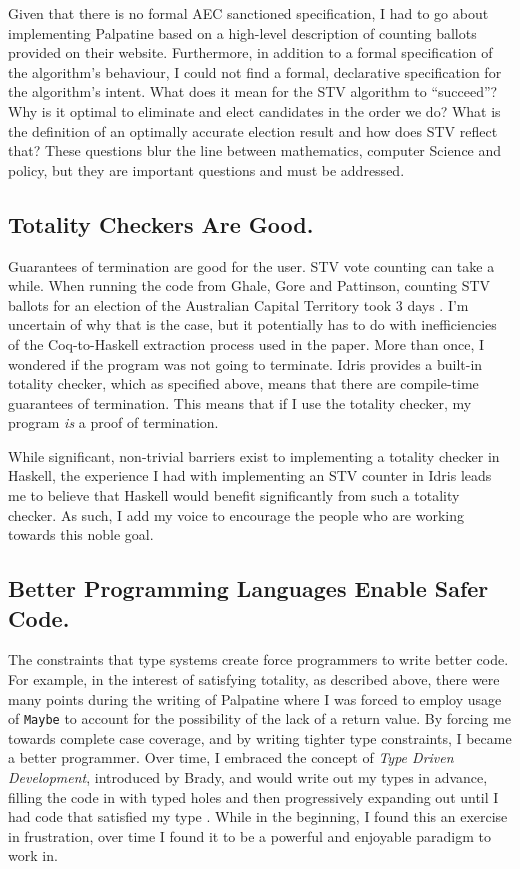 Given that there is no formal AEC sanctioned specification, I had to go about
implementing Palpatine based on a high-level description of counting ballots
provided on their website. Furthermore, in addition to a formal specification of
the algorithm's behaviour, I could not find a formal, declarative specification
for the algorithm's intent. What does it mean for the STV algorithm to
``succeed''? Why is it optimal to eliminate and elect candidates in the order we
do? What is the definition of an optimally accurate election result and how does
STV reflect that? These questions blur the line between mathematics, computer
Science and policy, but they are important questions and must be addressed. 

\subsection{Totality Checkers Are Good.}

Guarantees of termination are good for the user. STV vote counting can take a
while. When running the code from Ghale, Gore and Pattinson, counting STV
ballots for an election of the Australian Capital Territory took 3 days
\cite{stv_haskell}. I'm uncertain of why that is the case, but it potentially
has to do with inefficiencies of the Coq-to-Haskell extraction process used in
the paper. More than once, I wondered if the program was not going to terminate.
Idris provides a built-in totality checker, which as specified above, means that
there are compile-time guarantees of termination. This means that if I use the
totality checker, my program \textit{is} a proof of termination. 

While significant, non-trivial barriers exist to implementing a totality checker
in Haskell, the experience I had with implementing an STV counter in Idris leads
me to believe that Haskell would benefit significantly from such a totality
checker. As such, I add my voice to encourage the people who are working towards
this noble goal. 

\subsection{Better Programming Languages Enable Safer Code.}

The constraints that type systems create force programmers to write better code.
For example, in the interest of satisfying totality, as described above, there
were many points during the writing of Palpatine where I was forced to employ
usage of \texttt{Maybe} to account for the possibility of the lack of a return
value. By forcing me towards complete case coverage, and by writing tighter type
constraints, I became a better programmer. Over time, I embraced the concept of
\textit{Type Driven Development}, introduced by Brady, and would write out my
types in advance, filling the code in with typed holes and then progressively
expanding out until I had code that satisfied my type \cite{tdd_book}. While in
the beginning, I found this an exercise in frustration, over time I found it to
be a powerful and enjoyable paradigm to work in. 

